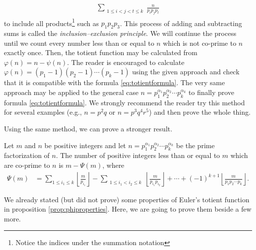 \documentclass[12pt]{subfile}
\begin{document}
			\begin{align*}
				\sum\limits_{\substack{1\leq i<j<t\leq k}} \frac{n}{p_ip_jp_t}
			\end{align*}
		to include all products\footnote{Notice the indices under the summation notation} such as $p_1p_2p_3$. This process of adding and subtracting sums is called the \textit{inclusion--exclusion principle}. We will continue the process until we count every number less than or equal to $n$ which is not co-prime to $n$ exactly once. Then, the totient function may be calculated from $\varphi(n) = n - \psi(n)$. The reader is encouraged to calculate $\varphi(n) = (p_1-1)(p_2-1) \cdots (p_k-1)$ using the given approach and check that it is compatible with the formula \ref{eq:totientformula}. The very same approach may be applied to the general case $n= p_1^{\alpha_1} p_2^{\alpha_2} \cdots p_k^{\alpha_k}$ to finally prove formula \ref{eq:totientformula}. We strongly recommend the reader try this method for several examples (e.g., $n=p^2q$ or $n = p^3 q^4r^5$) and then prove the whole thing.

		Using the same method, we can prove a stronger result.

		\begin{theorem}
			Let $m$ and $n$ be positive integers and let $n= p_1^{\alpha_1} p_2^{\alpha_2} \cdots p_k^{\alpha_k}$ be the prime factorization of $n$. The number of positive integers less than or equal to $m$ which are co-prime to $n$ is $m - \Psi(m)$, where
			\begin{align*}
			\Psi(m) &= \sum_{1 \leq i_1 \leq k} \left\lfloor\frac{m}{p_{i_1}} \right\rfloor - \sum_{\substack{1 \leq i_1<i_2 \leq k}} \left\lfloor\frac{m}{p_{i_1}p_{i_2}} \right\rfloor + \cdots + (-1)^{k+1} \left\lfloor\frac{m}{p_1p_2\cdots p_k} \right\rfloor.
			\end{align*}
		\end{theorem}
		We already stated (but did not prove) some properties of Euler's totient function in proposition \ref{prop:phiproperties}. Here, we are going to prove them beside a few more.
\end{document}
